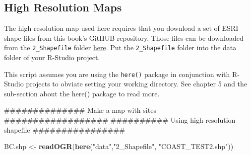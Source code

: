 \documentclass[]{book}
\newenvironment{Shaded}{\begin{snugshade}}{\end{snugshade}}
\newcommand{\KeywordTok}[1]{\textcolor[rgb]{0.13,0.29,0.53}{\textbf{#1}}}
\newcommand{\DataTypeTok}[1]{\textcolor[rgb]{0.13,0.29,0.53}{#1}}
\newcommand{\StringTok}[1]{\textcolor[rgb]{0.31,0.60,0.02}{#1}}
\newcommand{\CommentTok}[1]{\textcolor[rgb]{0.56,0.35,0.01}{\textit{#1}}}
\newcommand{\OtherTok}[1]{\textcolor[rgb]{0.56,0.35,0.01}{#1}}
\newcommand{\OperatorTok}[1]{\textcolor[rgb]{0.81,0.36,0.00}{\textbf{#1}}}
\newcommand{\AlertTok}[1]{\textcolor[rgb]{0.94,0.16,0.16}{#1}}
\newcommand{\NormalTok}[1]{#1}
\begin{document}
\begin{Shaded}
\end{Shaded}

\subsection{High Resolution Maps}\label{high-resolution-maps}

The high resolution map used here requires that you download a set of
ESRI shape files from this book's GitHUB repository. Those files can be
downloaded from the \texttt{2\_Shapefile} folder
\href{https://github.com/HakaiInstitute/hakai_guide_to_r/tree/master/data}{here}.
Put the \texttt{2\_Shapefile} folder into the data folder of your
R-Studio project.

This script assumes you are using the \texttt{here()} package in
conjunction with R-Studio projects to obviate setting your working
directory. See chapter 5 and the sub-section about the here() package to
read more.

\begin{Shaded}
\begin{Highlighting}[]
\NormalTok{############## Make a map with sites ################## }
\NormalTok{########## Using high resolution shapefile ################}

\NormalTok{BC.shp <-}\StringTok{ }\KeywordTok{readOGR}\NormalTok{(}\KeywordTok{here}\NormalTok{(}\StringTok{"data"}\NormalTok{,}\StringTok{"2_Shapefile"}\NormalTok{, }\StringTok{"COAST_TEST2.shp"}\NormalTok{))}
\end{Highlighting}
\end{Shaded}
\end{document}
